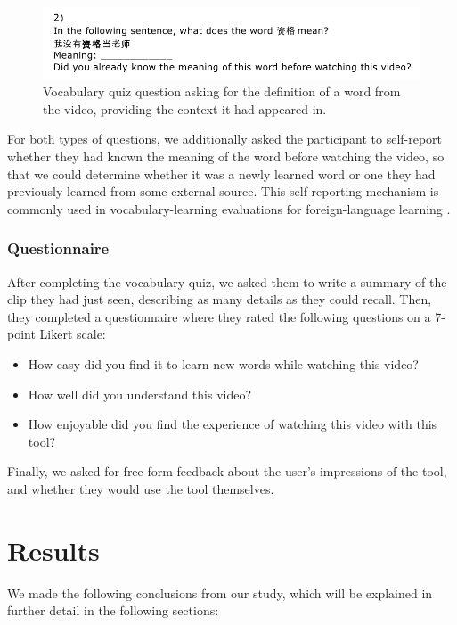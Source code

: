 \documentclass{sigchi}
\begin{document}
\begin{figure}[!h]
\centering
\includegraphics[width=\columnwidth]{vocab-quiz-2}
\caption{Vocabulary quiz question asking for the definition
of a word from the video, providing the context it had appeared in.}
\label{fig:figure5}
\end{figure}

For both types of questions, we additionally asked the participant to self-report whether they had known the meaning of the word before watching the video, so that we could determine whether it was a newly learned word or one they had previously learned from some external source. This self-reporting mechanism is commonly used in vocabulary-learning evaluations for foreign-language learning \cite{wesche1996assessing}.

\subsubsection{Questionnaire}

After completing the vocabulary quiz, we asked them to write a summary of the clip they had
just seen, describing as many details as they could recall. Then, they completed
a questionnaire where they rated the following questions on a 7-point Likert scale:

\begin{itemize}[noitemsep]
\item How easy did you find it to learn new words while watching this video?
\item How well did you understand this video?
\item How enjoyable did you find the experience of watching this video with this tool?
\end{itemize}

Finally, we asked for free-form feedback about the user's impressions of the tool, and whether they would use the tool themselves.

\section{Results}

We made the following conclusions from our study, which will be explained in
further detail in the following sections:
\end{document}

